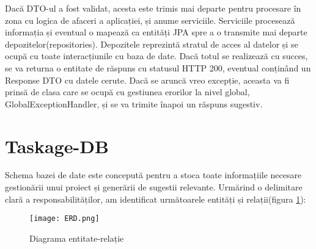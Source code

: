Dacă DTO-ul a fost validat, acesta este trimis mai departe pentru procesare în zona cu logica de afaceri a aplicației, și anume serviciile. Serviciile procesează informația și eventual o mapează ca entități JPA spre a o transmite mai departe depozitelor(repositories). Depozitele reprezintă stratul de acces al datelor și se ocupă cu toate interacțiunile cu baza de date. Dacă totul se realizează cu succes, se va returna o entitate de răspuns cu statusul HTTP 200, eventual conținând un Response DTO cu datele cerute. Dacă se aruncă vreo excepție, aceasta va fi prinsă de clasa care se ocupă cu gestiunea erorilor la nivel global, GlobalExceptionHandler, și se va trimite înapoi un răspuns sugestiv.

\section{Taskage-DB}

Schema bazei de date este concepută pentru a stoca toate informațiile necesare gestionării unui proiect și generării de sugestii relevante. Urmărind o delimitare clară a responsabilităților, am identificat următoarele entități și relații(figura \ref{erd}):

 \begin{figure}[H]
	\centering
 	 \texttt{[image: ERD.png]}
	\caption{Diagrama entitate-relație}
	\label{erd}
 \end{figure}

